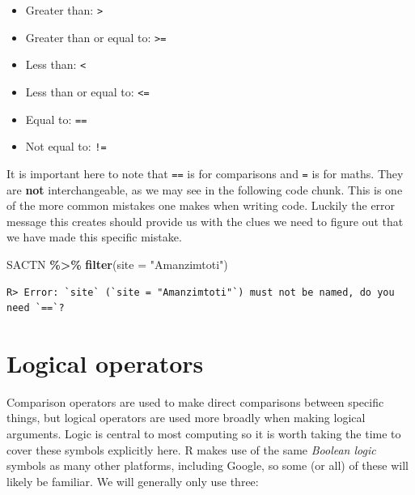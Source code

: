 \documentclass[
]{book}
\newenvironment{Shaded}{\begin{snugshade}}{\end{snugshade}}
\newcommand{\DataTypeTok}[1]{\textcolor[rgb]{0.13,0.29,0.53}{#1}}
\newcommand{\KeywordTok}[1]{\textcolor[rgb]{0.13,0.29,0.53}{\textbf{#1}}}
\newcommand{\NormalTok}[1]{#1}
\newcommand{\OperatorTok}[1]{\textcolor[rgb]{0.81,0.36,0.00}{\textbf{#1}}}
\newcommand{\StringTok}[1]{\textcolor[rgb]{0.31,0.60,0.02}{#1}}
\providecommand{\tightlist}{%
  \setlength{\itemsep}{0pt}\setlength{\parskip}{0pt}}
\begin{document}
\begin{itemize}
\tightlist
\item
  Greater than: \texttt{\textgreater{}}\\
\item
  Greater than or equal to: \texttt{\textgreater{}=}\\
\item
  Less than: \texttt{\textless{}}\\
\item
  Less than or equal to: \texttt{\textless{}=}\\
\item
  Equal to: \texttt{==}\\
\item
  Not equal to: \texttt{!=}
\end{itemize}

It is important here to note that \texttt{==} is for comparisons and \texttt{=} is for maths. They are \textbf{not} interchangeable, as we may see in the following code chunk. This is one of the more common mistakes one makes when writing code. Luckily the error message this creates should provide us with the clues we need to figure out that we have made this specific mistake.

\begin{Shaded}
\begin{Highlighting}[]
\NormalTok{SACTN }\OperatorTok{\%>\%}\StringTok{ }
\StringTok{  }\KeywordTok{filter}\NormalTok{(}\DataTypeTok{site =} \StringTok{"Amanzimtoti"}\NormalTok{)}
\end{Highlighting}
\end{Shaded}

\begin{verbatim}
R> Error: `site` (`site = "Amanzimtoti"`) must not be named, do you need `==`?
\end{verbatim}

\hypertarget{logical-operators}{%
\section{Logical operators}\label{logical-operators}}

Comparison operators are used to make direct comparisons between specific things, but logical operators are used more broadly when making logical arguments. Logic is central to most computing so it is worth taking the time to cover these symbols explicitly here. R makes use of the same \emph{Boolean logic} symbols as many other platforms, including Google, so some (or all) of these will likely be familiar. We will generally only use three:
\end{document}
